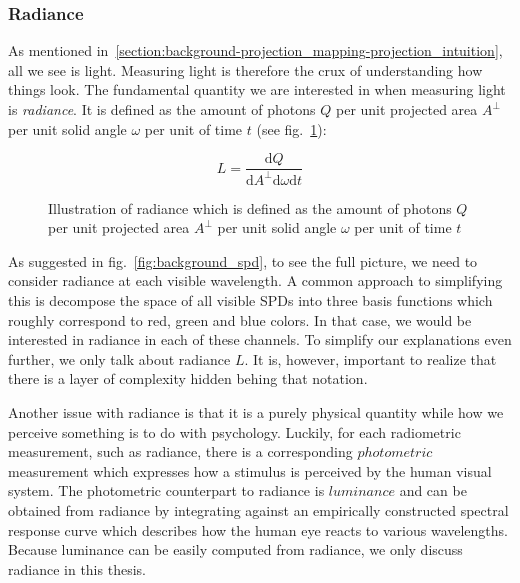 \subsubsection{Radiance}
\label{section:background-projection_mapping-light_transport-radiance}

As mentioned in~\ref{section:background-projection_mapping-projection_intuition}, all we see is light. Measuring light is therefore the crux of understanding how things look. The fundamental quantity we are interested in when measuring light is \textit{radiance}. It is defined as the amount of photons \(Q\) per unit projected area \(A^\perp \) per unit solid angle \(\omega\) per unit of time \(t\) (see fig.~\ref{fig:background_radiance}):

\begin{equation}
    \label{eq:radiance}
    L = \frac{\mathrm{d}Q}{\mathrm{d}A^\perp \mathrm{d}\omega \mathrm{d}t}
\end{equation}

\begin{figure}
    \centering
    \def\svgwidth{0.5\textwidth}
    
    \caption{Illustration of radiance which is defined as the amount of photons \(Q\) per unit projected area \(A^\perp \) per unit solid angle \(\omega\) per unit of time \(t\)}
    \label{fig:background_radiance}
\end{figure}

As suggested in fig.~\ref{fig:background_spd}, to see the full picture, we need to consider radiance at each visible wavelength. A common approach to simplifying this is decompose the space of all visible SPDs into three basis functions which roughly correspond to red, green and blue colors. In that case, we would be interested in radiance in each of these channels. To simplify our explanations even further, we only talk about radiance \(L\). It is, however, important to realize that there is a layer of complexity hidden behing that notation.

Another issue with radiance is that it is a purely physical quantity while how we perceive something is to do with psychology. Luckily, for each radiometric measurement, such as radiance, there is a corresponding \(photometric\) measurement which expresses how a stimulus is perceived by the human visual system. The photometric counterpart to radiance is \(luminance\) and can be obtained from radiance by integrating against an empirically constructed spectral response curve which describes how the human eye reacts to various wavelengths. Because luminance can be easily computed from radiance, we only discuss radiance in this thesis.

